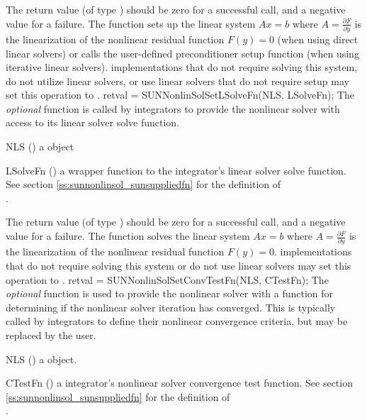 {
  The return value  (of type ) should be zero for a
  successful call, and a negative value for a failure.
}
{
  The  function sets up the linear system $Ax=b$ where
  $A = \frac{\partial F}{\partial y}$ is the linearization of the nonlinear
  residual function $F(y) = 0$ (when using {\sunlinsol} direct linear solvers)
  or calls the user-defined preconditioner setup function (when using
  {\sunlinsol} iterative linear solvers). {\sunnonlinsol} implementations that
  do not require solving this system, do not utilize {\sunlinsol} linear
  solvers, or use {\sunlinsol} linear solvers that do not require setup may set
  this operation to .
}
{
  retval = SUNNonlinSolSetLSolveFn(NLS, LSolveFn);
}
{
  The \textit{optional} function  is called by
  {\sundials} integrators to provide the nonlinear solver with access to
  its linear solver solve function.
}
{
  \begin{args}[LSolveFn]
  \item[NLS] ()
    a {\sunnonlinsol} object
  \item[LSolveFn] ()
    a wrapper function to the {\sundials} integrator's linear solver solve
    function. See section \ref{ss:sunnonlinsol_sunsuppliedfn} for the definition
    of\\ \noindent
    .
  \end{args}
}
{
  The return value  (of type ) should be zero for a
  successful call, and a negative value for a failure.
}
{
  The  function solves the linear system $Ax=b$ where
  $A = \frac{\partial F}{\partial y}$ is the linearization of the nonlinear
  residual function $F(y) = 0$. {\sunnonlinsol} implementations that do not
  require solving this system or do not use {\sunlinsol} linear solvers may set
  this operation to .
}
{
  retval = SUNNonlinSolSetConvTestFn(NLS, CTestFn);
}
{
  The \textit{optional} function  is used to
  provide the nonlinear solver with a function for determining if the nonlinear
  solver iteration has converged. This is typically called by {\sundials}
  integrators to define their nonlinear convergence criteria, but may be replaced
  by the user.
}
{
  \begin{args}[CTestFn]
  \item[NLS] ()
    a {\sunnonlinsol} object.
  \item[CTestFn] ()
    a {\sundials} integrator's nonlinear solver convergence test function. See
    section \ref{ss:sunnonlinsol_sunsuppliedfn} for the definition of\\ \noindent
    .
  \end{args}
}
